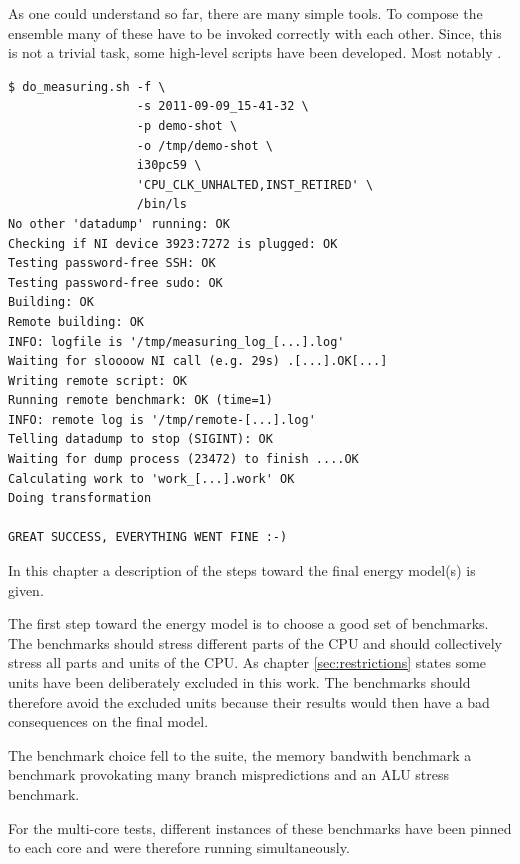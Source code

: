 As one could understand so far, there are many simple tools. To compose
the ensemble many of these have to be invoked correctly with each other. Since,
this is not a trivial task, some high-level scripts have been developed. Most
notably \JWTdomeasuring{}.

\begin{lstlisting}[style=Shell]
$ do_measuring.sh -f \
                  -s 2011-09-09_15-41-32 \
                  -p demo-shot \
                  -o /tmp/demo-shot \
                  i30pc59 \
                  'CPU_CLK_UNHALTED,INST_RETIRED' \
                  /bin/ls
No other 'datadump' running: OK
Checking if NI device 3923:7272 is plugged: OK
Testing password-free SSH: OK
Testing password-free sudo: OK
Building: OK
Remote building: OK
INFO: logfile is '/tmp/measuring_log_[...].log'
Waiting for sloooow NI call (e.g. 29s) .[...].OK[...]
Writing remote script: OK
Running remote benchmark: OK (time=1)
INFO: remote log is '/tmp/remote-[...].log'
Telling datadump to stop (SIGINT): OK
Waiting for dump process (23472) to finish ....OK
Calculating work to 'work_[...].work' OK
Doing transformation

GREAT SUCCESS, EVERYTHING WENT FINE :-)
\end{lstlisting}


\label{sec:towards-the-model}

In this chapter a description of the steps toward the final energy model(s) is
given.


\label{sec:benchmarks}

The first step toward the energy model is to choose a good set of benchmarks.
The benchmarks should stress different parts of the CPU and should collectively
stress all parts and units of the CPU. As chapter \ref{sec:restrictions} states
some units have been deliberately excluded in this work. The benchmarks should
therefore avoid the excluded units because their results would then have a bad
consequences on the final model.

The benchmark choice fell to the \JWTLspec{} suite, the memory bandwith
benchmark \JWTLstream{} a benchmark provokating many branch mispredictions
and an ALU stress benchmark.

For the multi-core tests, different instances of these benchmarks have been
pinned to each core and were therefore running simultaneously.


